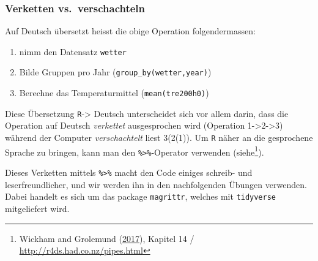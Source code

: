 \documentclass[]{book}
\newenvironment{Shaded}{\begin{snugshade}}{\end{snugshade}}
\newcommand{\CommentTok}[1]{\textcolor[rgb]{0.56,0.35,0.01}{\textit{#1}}}
\newcommand{\DataTypeTok}[1]{\textcolor[rgb]{0.13,0.29,0.53}{#1}}
\newcommand{\KeywordTok}[1]{\textcolor[rgb]{0.13,0.29,0.53}{\textbf{#1}}}
\newcommand{\NormalTok}[1]{#1}
\newcommand{\OperatorTok}[1]{\textcolor[rgb]{0.81,0.36,0.00}{\textbf{#1}}}
\newcommand{\StringTok}[1]{\textcolor[rgb]{0.31,0.60,0.02}{#1}}
\providecommand{\tightlist}{%
  \setlength{\itemsep}{0pt}\setlength{\parskip}{0pt}}
\let\rmarkdownfootnote\footnote%
\def\footnote{\protect\rmarkdownfootnote}
\begin{document}
\hypertarget{verketten-vs.verschachteln}{%
\subsubsection{Verketten vs.~verschachteln}\label{verketten-vs.verschachteln}}

Auf Deutsch übersetzt heisst die obige Operation folgendermassen:

\begin{enumerate}
\def\labelenumi{\arabic{enumi})}
\tightlist
\item
  nimm den Datensatz \texttt{wetter}
\item
  Bilde Gruppen pro Jahr (\texttt{group\_by(wetter,year)})
\item
  Berechne das Temperaturmittel (\texttt{mean(tre200h0)})
\end{enumerate}

Diese Übersetzung \texttt{R}-\textgreater{} Deutsch unterscheidet sich vor allem darin, dass die Operation auf Deutsch \emph{verkettet} ausgesprochen wird (Operation 1-\textgreater{}2-\textgreater{}3) während der Computer \emph{verschachtelt} liest 3(2(1)). Um \texttt{R} näher an die gesprochene Sprache zu bringen, kann man den \texttt{\%\textgreater{}\%}-Operator verwenden (siehe\footnote{Wickham and Grolemund (\protect\hyperlink{ref-wickham2017}{2017}), Kapitel 14 / \url{http://r4ds.had.co.nz/pipes.html}}).

\begin{Shaded}
\end{Shaded}

Dieses Verketten mittels \texttt{\%\textgreater{}\%} macht den Code einiges schreib- und leserfreundlicher, und wir werden ihn in den nachfolgenden Übungen verwenden. Dabei handelt es sich um das package \texttt{magrittr}, welches mit \texttt{tidyverse} mitgeliefert wird.
\end{document}
